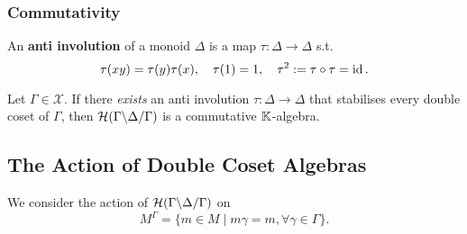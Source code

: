 \subsubsection{Commutativity}
An \textbf{anti involution} of a monoid $\Delta$
is a map $\tau : \Delta\to\Delta$ s.t. \[\tau(xy) = \tau(y)\tau(x),\quad \tau(1) = 1,\quad \tau^2 := \tau\circ\tau = \operatorname{id}.\]
\begin{theorem}\label{hecke alg comm if anti involution}
    Let $\Gamma\in\mathscr{X}$.
    If there \textit{exists} an anti involution $\tau : \Delta\to \Delta$ that stabilises every double coset of $\Gamma$, then $\mathcal{H}({\Gamma}\backslash {\Delta}\slash {\Gamma})$ is a commutative $\mathbb{K}$-algebra.
\end{theorem}




\subsection{The Action of Double Coset Algebras}

We consider the action of $\mathcal{H}({\Gamma}\backslash {\Delta}\slash {\Gamma})$ on \[M^\Gamma = \{m\in M\mid m\gamma = m, \forall \gamma\in\Gamma\}.\]

